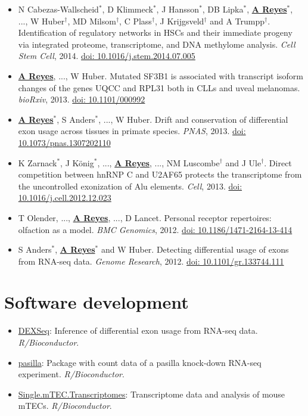 \documentclass[11pt,a4paper,sans]{moderncv} %
\begin{document}
\begin{itemize}
\item N Cabezas-Wallscheid$^{\ast}$, D Klimmeck$^{\ast}$, J Hansson$^{\ast}$, DB Lipka$^{\ast}$, \textbf{\underline{A Reyes}}$^{\ast}$, ..., W Huber$^{\dagger}$, MD Milsom$^{\dagger}$, C Plass$^{\dagger}$, J Krijgsveld$^{\dagger}$ and A Trumpp$^{\dagger}$. Identification of regulatory networks in HSCs and their immediate progeny via integrated proteome, transcriptome, and DNA methylome analysis. \textit{Cell Stem Cell}, 2014. \href{https://doi.org/10.1016/j.stem.2014.07.005}{doi: 10.1016/j.stem.2014.07.005}
\item \textbf{\underline{A Reyes}}, ..., W Huber. Mutated SF3B1 is associated with transcript isoform changes of the genes UQCC and RPL31 both in CLLs and uveal melanomas. \textit{bioRxiv}, 2013. \href{https://doi.org/10.1101/000992}{doi: 10.1101/000992}
\item \textbf{\underline{A Reyes}}$^{\ast}$, S Anders$^{\ast}$, ..., W Huber. Drift and conservation of differential exon usage across tissues in primate species. \textit{PNAS}, 2013. \href{https://doi.org/10.1073/pnas.1307202110}{doi: 10.1073/pnas.1307202110}
\item K Zarnack$^{\ast}$, J K\"{o}nig$^{\ast}$, ..., \textbf{\underline{A Reyes}}, ..., NM Luscombe$^{\dagger}$ and J Ule$^{\dagger}$. Direct competition between hnRNP C and U2AF65 protects the transcriptome from the uncontrolled exonization of Alu elements. \textit{Cell}, 2013. \href{https://doi.org/10.1016/j.cell.2012.12.023}{doi: 10.1016/j.cell.2012.12.023}
\item T Olender, ..., \textbf{\underline{A Reyes}}, ..., D Lancet. Personal receptor repertoires: olfaction as a model. \textit{BMC Genomics}, 2012. \href{https://doi.org/10.1186/1471-2164-13-414}{doi: 10.1186/1471-2164-13-414}
\item S Anders$^{\ast}$, \textbf{\underline{A Reyes}}$^{\ast}$ and W Huber. Detecting differential usage of exons from RNA-seq data. \textit{Genome Research}, 2012. \href{https://doi.org/10.1101/gr.133744.111}{doi: 10.1101/gr.133744.111}
\end{itemize}
\vspace{-.13cm}
\section{Software development}
\vspace{-.1cm}
\begin{itemize}
\item \href{http://www.bioconductor.org/packages/release/bioc/html/DEXSeq.html}{DEXSeq}: Inference of differential exon usage from RNA-seq data. \textit{R/Bioconductor}.
\item \href{http://bioconductor.org/packages/release/data/experiment/html/pasilla.html}{pasilla}: Package with count data of a pasilla knock-down RNA-seq experiment. \textit{R/Bioconductor}.
\item \href{http://bioconductor.org/packages/release/data/experiment/html/Single.mTEC.Transcriptomes.html}{Single.mTEC.Transcriptomes}: Transcriptome data and analysis of mouse mTECs. \textit{R/Bioconductor}.
\end{itemize}
\vspace{-.2cm}
\end{document}
